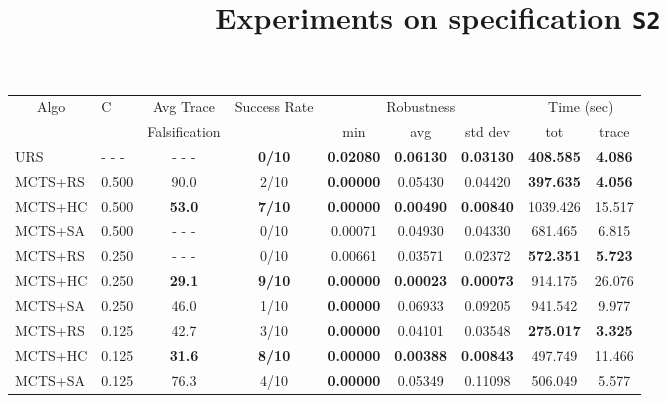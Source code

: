 \documentclass[11pt]{article}
\begin{document}
\begin{table}[ht]
\centering
\title{Experiments on specification \texttt{S2}}
\begin{tabular}{|l|l|c|c|c|c|c|c|c|}
\hline
\multicolumn{1}{|c|}{\multirow{2}{*}{Algo}} & \multirow{2}{*}{C} & Avg Trace               & \multirow{2}{*}{Success Rate} & \multicolumn{3}{c|}{Robustness} & \multicolumn{2}{c|}{Time (sec)} \\ \cline{5-9} 
\multicolumn{1}{|c|}{}                      &                    & Falsification           &                               & min      & avg      & std dev  & tot        & trace        \\ \hline
URS                                         & - - -              & - - -                   & \textbf{0/10}                 & \textbf{0.02080}  & \textbf{0.06130}  & \textbf{0.03130}  &  \textbf{408.585}   &  \textbf{4.086}       \\ \hline
MCTS+RS                                     & 0.500              &  90.0                   & 2/10                          & \textbf{0.00000}  & 0.05430  & 0.04420  &  \textbf{397.635}   &  \textbf{4.056}       \\
MCTS+HC                                     & 0.500              &  \textbf{53.0}          & \textbf{7/10}                 & \textbf{0.00000}  & \textbf{0.00490}  & \textbf{0.00840}  & 1039.426   & 15.517       \\
MCTS+SA                                     & 0.500              & - - -                   & 0/10                          & 0.00071  & 0.04930  & 0.04330  &  681.465   &  6.815       \\ \hline

MCTS+RS                                     & 0.250              & - - -                   & 0/10                          & 0.00661  & 0.03571  & 0.02372  &  \textbf{572.351}   &  \textbf{5.723}       \\
MCTS+HC                                     & 0.250              &  \textbf{29.1}                   & \textbf{9/10}                          & \textbf{0.00000}  & \textbf{0.00023}  & \textbf{0.00073}  &  914.175   & 26.076       \\
MCTS+SA                                     & 0.250              &  46.0                   & 1/10                          & \textbf{0.00000}  & 0.06933  & 0.09205  &  941.542   &  9.977       \\ \hline

MCTS+RS                                     & 0.125              &  42.7                   & 3/10                          & \textbf{0.00000}  & 0.04101  & 0.03548  &  \textbf{275.017}   &  \textbf{3.325}       \\
MCTS+HC                                     & 0.125              &  \textbf{31.6}                   & \textbf{8/10}                          & \textbf{0.00000}  & \textbf{0.00388}  & \textbf{0.00843}  &  497.749   & 11.466       \\
MCTS+SA                                     & 0.125              &  76.3                   & 4/10                          & \textbf{0.00000}  & 0.05349  & 0.11098  &  506.049   &  5.577       \\ \hline


\end{tabular}
\end{table}
\end{document}
